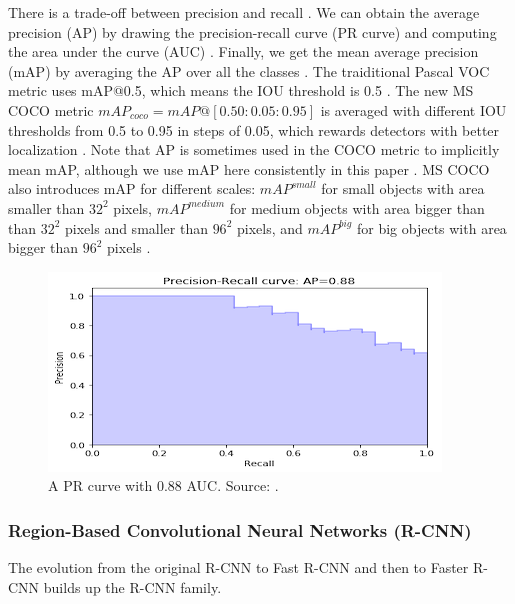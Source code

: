 \documentclass[a4paper, 11pt, oneside]{article}
\begin{document}
  There is a trade-off between precision and recall
  \cite{elgendy2020deep, geron2019hands, burkov2019hundred, planche2019hands}. We can obtain the average precision
  (AP) by drawing the precision-recall curve (PR curve) and computing the area under the curve (AUC)
  \cite{elgendy2020deep, planche2019hands}. Finally, we get the mean average precision (mAP) by averaging
  the AP over all the classes \cite{elgendy2020deep, geron2019hands, planche2019hands}.
  The traiditional Pascal VOC metric uses mAP@0.5, which means the IOU threshold is 0.5
  \cite{liu2020deep, everingham2010pascal, planche2019hands}. The new MS COCO metric $mAP_{coco} = mAP@[0.50:0.05:0.95]$
  is averaged with different IOU thresholds from 0.5 to 0.95 in steps of 0.05, which rewards detectors with better
  localization \cite{liu2020deep, planche2019hands, cocometrics}. Note that AP is sometimes used in the COCO metric to
  implicitly mean mAP, although we use mAP here consistently in this paper \cite{cocometrics}. MS COCO also
  introduces mAP for different scales: $mAP^{small}$ for small objects with area smaller than $32^2$ pixels,
  $mAP^{medium}$ for medium objects with area bigger than than $32^2$ pixels and smaller than $96^2$ pixels, and
  $mAP^{big}$ for big objects with area bigger than $96^2$ pixels \cite{liu2020deep, cocometrics}.

  \begin{figure}[ht]
    \begin{center}
      \includegraphics[width=.8\textwidth]{pr_curve.png}
    \end{center}
    \caption{A PR curve with 0.88 AUC. Source: \cite{planche2019hands}.}
  \end{figure}

  \subsubsection{Region-Based Convolutional Neural Networks (R-CNN)}

  The evolution from the original R-CNN \cite{girshick2014rich} to Fast R-CNN \cite{girshick2015fast} and then to
  Faster R-CNN \cite{ren2015faster} builds up the R-CNN family.
\end{document}
